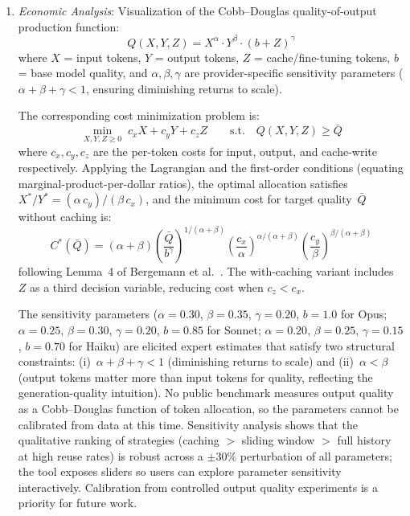 \documentclass[a4paper,fleqn]{cas-dc}
\begin{document}
\begin{enumerate}
  \item \textit{Economic Analysis}: Visualization of the Cobb--Douglas quality-of-output production function:
  \begin{equation}
    Q(X, Y, Z) = X^{\alpha} \cdot Y^{\beta} \cdot (b + Z)^{\gamma}
  \end{equation}
  where $X$ = input tokens, $Y$ = output tokens, $Z$ = cache/fine-tuning tokens, $b$ = base model quality, and $\alpha, \beta, \gamma$ are provider-specific sensitivity parameters ($\alpha + \beta + \gamma < 1$, ensuring diminishing returns to scale).

  The corresponding cost minimization problem is:
  \begin{equation}
    \min_{X,Y,Z \geq 0} \; c_x X + c_y Y + c_z Z \qquad \text{s.t.} \quad Q(X,Y,Z) \geq \bar{Q}
  \end{equation}
  where $c_x, c_y, c_z$ are the per-token costs for input, output, and cache-write respectively.
  Applying the Lagrangian and the first-order conditions (equating marginal-product-per-dollar ratios), the optimal allocation satisfies $X^*/Y^* = (\alpha\, c_y) / (\beta\, c_x)$, and the minimum cost for target quality~$\bar{Q}$ without caching is:
  \begin{equation}
    C^*(\bar{Q}) = (\alpha + \beta) \left(\frac{\bar{Q}}{b^{\gamma}}\right)^{\!1/(\alpha+\beta)} \left(\frac{c_x}{\alpha}\right)^{\!\alpha/(\alpha+\beta)} \left(\frac{c_y}{\beta}\right)^{\!\beta/(\alpha+\beta)}
  \end{equation}
  following Lemma~4 of Bergemann et al.~\cite{bergemann2025economics}. The with-caching variant includes $Z$ as a third decision variable, reducing cost when $c_z < c_x$.

  The sensitivity parameters ($\alpha = 0.30$, $\beta = 0.35$, $\gamma = 0.20$, $b = 1.0$ for Opus; $\alpha = 0.25$, $\beta = 0.30$, $\gamma = 0.20$, $b = 0.85$ for Sonnet; $\alpha = 0.20$, $\beta = 0.25$, $\gamma = 0.15$, $b = 0.70$ for Haiku) are elicited expert estimates that satisfy two structural constraints: (i)~$\alpha + \beta + \gamma < 1$ (diminishing returns to scale) and (ii)~$\alpha < \beta$ (output tokens matter more than input tokens for quality, reflecting the generation-quality intuition). No public benchmark measures output quality as a Cobb–Douglas function of token allocation, so the parameters cannot be calibrated from data at this time. Sensitivity analysis shows that the qualitative ranking of strategies (caching $>$ sliding window $>$ full history at high reuse rates) is robust across a $\pm 30\%$ perturbation of all parameters; the tool exposes sliders so users can explore parameter sensitivity interactively. Calibration from controlled output quality experiments is a priority for future work.


\end{enumerate}
\end{document}
